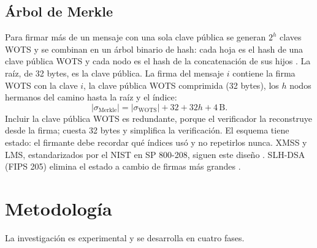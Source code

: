 \documentclass[12pt,letterpaper]{article}
\newif\ifborrador
\newcommand{\pend}[1]{\ifborrador\textcolor{red}{\textbf{[#1]}}\fi}
\newcommand{\B}{\,\mathrm{B}}   %
\begin{document}
\subsection{Árbol de Merkle}
Para firmar más de un mensaje con una sola clave pública se generan $2^h$ claves WOTS y se combinan en un árbol binario de hash: cada hoja es el hash de una clave pública WOTS y cada nodo es el hash de la concatenación de sus hijos \parencite{merkle1989}. La raíz, de 32 bytes, es la clave pública. La firma del mensaje $i$ contiene la firma WOTS con la clave $i$, la clave pública WOTS comprimida (32 bytes), los $h$ nodos hermanos del camino hasta la raíz y el índice:
\begin{equation}
  |\sigma_{\mathrm{Merkle}}| = |\sigma_{\mathrm{WOTS}}| + 32 + 32h + 4\B .
\end{equation}
Incluir la clave pública WOTS es redundante, porque el verificador la reconstruye desde la firma; cuesta 32 bytes y simplifica la verificación.
El esquema tiene estado: el firmante debe recordar qué índices usó y no repetirlos nunca. XMSS y LMS, estandarizados por el NIST en SP 800-208, siguen este diseño \parencite{nist800208}. SLH-DSA (FIPS 205) elimina el estado a cambio de firmas más grandes \parencite{fips205}. \pend{P3: confirmar en FIPS 205 los tamaños de firma del nivel de 128 bits}

\section{Metodología}
La investigación es experimental y se desarrolla en cuatro fases.
\end{document}
